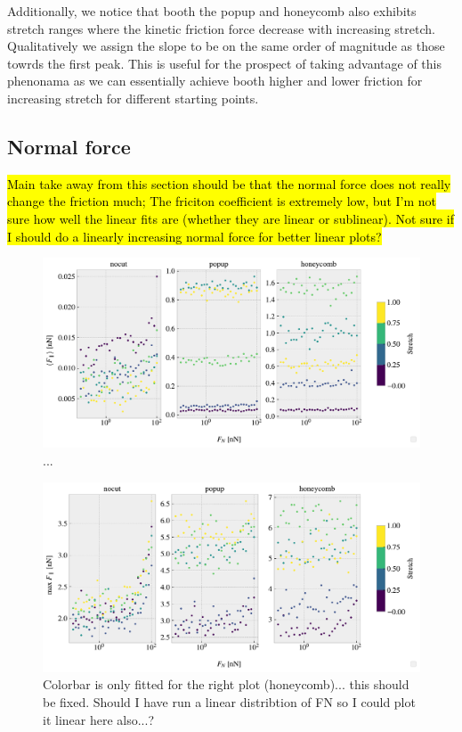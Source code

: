 Additionally, we notice that booth the popup and honeycomb also exhibits stretch ranges where the kinetic friction force decrease with increasing stretch. Qualitatively we assign the slope to be on the same order of magnitude as those towrds the first peak. This is useful for the prospect of taking advantage of this phenonama as we can essentially achieve booth higher and lower friction for increasing stretch for different starting points. 


\subsection{Normal force}

\hl{Main take away from this section should be that the normal force does not really change the friction much; The friciton coefficient is extremely low, but I'm not sure how well the linear fits are (whether they are linear or sublinear). Not sure if I should do a linearly increasing normal force for better linear plots?}

\begin{figure}[H]
  \centering
  \includegraphics[width=\linewidth]{figures/baseline/multi_FN_mean_compare.pdf}
  \caption{...}
  \label{fig:}
\end{figure}


\begin{figure}[H]
  \centering
  \includegraphics[width=\linewidth]{figures/baseline/multi_FN_max_compare.pdf}
  \caption{Colorbar is only fitted for the right plot (honeycomb)... this should be fixed. Should I have run a linear distribtion of FN so I could plot it linear here also...?}
  \label{fig:}
\end{figure}



